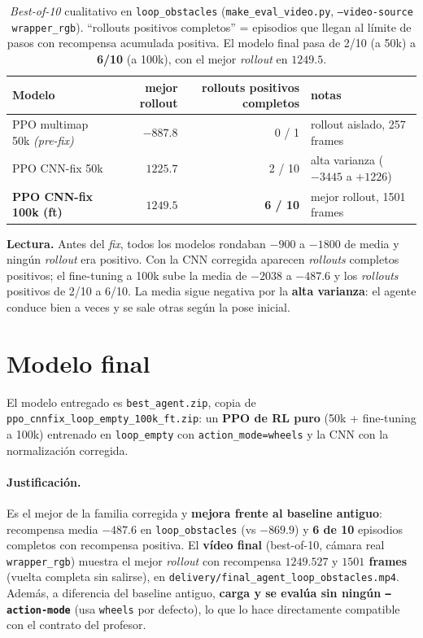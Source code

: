 \documentclass[11pt,a4paper]{article}
\newcommand{\code}[1]{\texttt{#1}}
\begin{document}
\begin{table}[h]
\centering
\footnotesize
\setlength{\tabcolsep}{6pt}
\begin{tabular}{lrrl}
\toprule
\textbf{Modelo} & \textbf{mejor rollout} & \textbf{rollouts positivos completos} & \textbf{notas} \\
\midrule
PPO multimap 50k \emph{(pre-fix)} & $-887.8$ & 0 / 1 & rollout aislado, 257 frames \\
PPO CNN-fix 50k                   & $1225.7$ & 2 / 10 & alta varianza ($-3445$ a $+1226$) \\
\textbf{PPO CNN-fix 100k (ft)}    & $\mathbf{1249.5}$ & \textbf{6 / 10} & mejor rollout, 1501 frames \\
\bottomrule
\end{tabular}
\caption{\emph{Best-of-10} cualitativo en \code{loop\_obstacles} (\code{make\_eval\_video.py},
\code{--video-source wrapper\_rgb}). ``rollouts positivos completos'' = episodios que llegan
al límite de pasos con recompensa acumulada positiva. El modelo final pasa de 2/10 (a 50k) a
\textbf{6/10} (a 100k), con el mejor \emph{rollout} en $1249.5$.}
\label{tab:bo10}
\end{table}

\noindent\textbf{Lectura.} Antes del \emph{fix}, todos los modelos rondaban $-900$ a $-1800$
de media y ningún \emph{rollout} era positivo. Con la CNN corregida aparecen \emph{rollouts}
completos positivos; el fine-tuning a 100k sube la media de $-2038$ a $-487.6$ y los
\emph{rollouts} positivos de 2/10 a 6/10. La media sigue negativa por la \textbf{alta varianza}:
el agente conduce bien a veces y se sale otras según la pose inicial.

\section{Modelo final}
El modelo entregado es \code{best\_agent.zip}, copia de
\code{ppo\_cnnfix\_loop\_empty\_100k\_ft.zip}: un \textbf{PPO de RL puro} (50k +
fine-tuning a 100k) entrenado en \code{loop\_empty} con \code{action\_mode=wheels} y la CNN
con la normalización corregida.

\paragraph{Justificación.} Es el mejor de la familia corregida y \textbf{mejora frente al
baseline antiguo}: recompensa media $-487.6$ en \code{loop\_obstacles} (vs $-869.9$) y
\textbf{6 de 10} episodios completos con recompensa positiva. El \textbf{vídeo final}
(best-of-10, cámara real \code{wrapper\_rgb}) muestra el mejor \emph{rollout} con recompensa
\textbf{$1249.527$} y \textbf{$1501$ frames} (vuelta completa sin salirse), en
\code{delivery/final\_agent\_loop\_obstacles.mp4}. Además, a diferencia del baseline antiguo,
\textbf{carga y se evalúa sin ningún \code{--action-mode}} (usa \code{wheels} por defecto),
lo que lo hace directamente compatible con el contrato del profesor.
\end{document}
